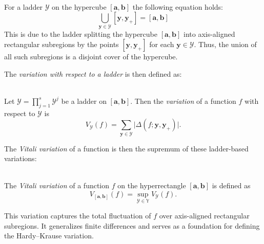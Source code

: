 \begin{remark} \ \\
    For a ladder $\mathcal{Y}$ on the hypercube
    $[\boldsymbol{a},\boldsymbol{b}]$ the following equation holds:
    \begin{equation*}
        \bigcup_{\boldsymbol{y}\in\mathcal{Y}}[\boldsymbol{y},\boldsymbol{y}_+] = [\boldsymbol{a},\boldsymbol{b}]
    \end{equation*}
    This is due to the ladder splitting the hypercube
    $[\boldsymbol{a},\boldsymbol{b}]$ into axis-aligned rectangular subregions
    by the points $[\boldsymbol{y},\boldsymbol{y}_+]$ for each $\boldsymbol{y}
    \in \mathcal{Y}$. Thus, the union of all such subregions is a disjoint cover
    of the hypercube.
\end{remark}
\qquad

The \emph{variation with respect to a ladder} is then defined as:

\begin{definition} \ \\
    \label{def:variation_ladder}
    Let $\mathcal{Y} = \prod\limits_{j=1}^s \mathcal{Y}^j$ be a ladder on
    $[\boldsymbol{a},\boldsymbol{b}]$. Then the \emph{variation} of a function $f$ with respect to
    $\mathcal{Y}$ is
    \begin{equation*}
        V_\mathcal{Y}(f) = \sum_{\boldsymbol{y} \in \mathcal{Y}} \big| \Delta(f; \boldsymbol{y}, \boldsymbol{y}_+) \big|.
    \end{equation*}
\end{definition}

The \emph{Vitali variation} of a function is then the supremum of these
ladder-based variations:

\begin{definition} \ \\
    The \emph{Vitali variation} of a function $f$ on the hyperrectangle
    $[\boldsymbol{a},\boldsymbol{b}]$ is defined as
    \begin{equation*}
        V_{[\boldsymbol{a},\boldsymbol{b}]}(f) = \sup_{\mathcal{Y} \in \mathbb{Y}} V_\mathcal{Y}(f).
    \end{equation*}
\end{definition}

This variation captures the total fluctuation of $f$ over axis-aligned
rectangular subregions. It generalizes finite differences and serves as a
foundation for defining the Hardy--Krause variation.

